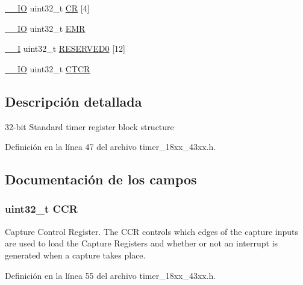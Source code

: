 \begin{DoxyCompactItemize}
\item 
\hyperlink{core__sc300_8h_aec43007d9998a0a0e01faede4133d6be}{\+\_\+\+\_\+\+IO} uint32\+\_\+t \hyperlink{struct_l_p_c___t_i_m_e_r___t_aea47130033090cb973776372977b302b}{CR} \mbox{[}4\mbox{]}
\item 
\hyperlink{core__sc300_8h_aec43007d9998a0a0e01faede4133d6be}{\+\_\+\+\_\+\+IO} uint32\+\_\+t \hyperlink{struct_l_p_c___t_i_m_e_r___t_a6034c7458d8e6030f6dacecf0f1a3a89}{E\+MR}
\item 
\hyperlink{core__sc300_8h_af63697ed9952cc71e1225efe205f6cd3}{\+\_\+\+\_\+I} uint32\+\_\+t \hyperlink{struct_l_p_c___t_i_m_e_r___t_a870db4ca47c36cc0c7c2c01c36ae5de1}{R\+E\+S\+E\+R\+V\+E\+D0} \mbox{[}12\mbox{]}
\item 
\hyperlink{core__sc300_8h_aec43007d9998a0a0e01faede4133d6be}{\+\_\+\+\_\+\+IO} uint32\+\_\+t \hyperlink{struct_l_p_c___t_i_m_e_r___t_a5cde523b810fab496eb0619abc06764d}{C\+T\+CR}
\end{DoxyCompactItemize}


\subsection{Descripción detallada}
32-\/bit Standard timer register block structure 

Definición en la línea 47 del archivo timer\+\_\+18xx\+\_\+43xx.\+h.



\subsection{Documentación de los campos}
\subsubsection[{\texorpdfstring{C\+CR}{CCR}}]{ uint32\+\_\+t C\+CR}\hypertarget{struct_l_p_c___t_i_m_e_r___t_a5e1322e27c40bf91d172f9673f205c97}{}\label{struct_l_p_c___t_i_m_e_r___t_a5e1322e27c40bf91d172f9673f205c97}
Capture Control Register. The C\+CR controls which edges of the capture inputs are used to load the Capture Registers and whether or not an interrupt is generated when a capture takes place. 

Definición en la línea 55 del archivo timer\+\_\+18xx\+\_\+43xx.\+h.

